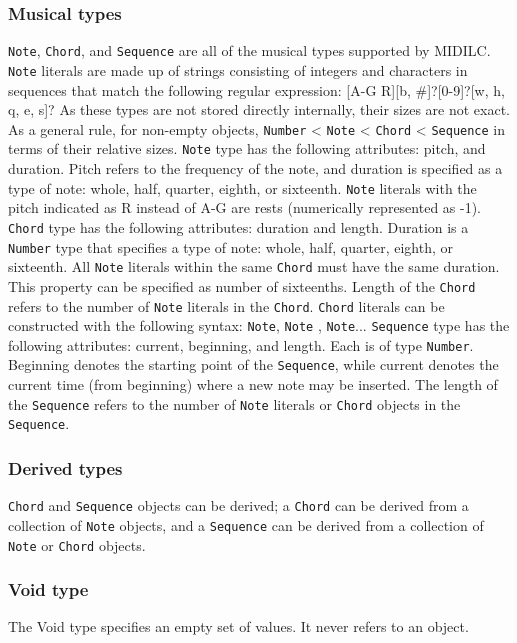 \documentclass[12pt,A4]{book}
\begin{document}
\subsubsection{Musical types}
\verb|Note|, \verb|Chord|, and \verb|Sequence| are all of the musical types supported by MIDILC. \verb|Note| literals are  made up of strings consisting of integers and characters in sequences that match the following regular expression:
[A-G R][b, #]?[0-9]?[w, h, q, e, s]?
As these types are not stored directly internally, their sizes are not exact. As a general rule, for non-empty objects,
\verb|Number| < \verb|Note| < \verb|Chord| < \verb|Sequence| in terms of their relative sizes.
\verb|Note| type has the following attributes: pitch, and duration. Pitch refers to the frequency of the note, and duration is specified as a type of note: whole, half, quarter, eighth, or sixteenth.  \verb|Note| literals with the pitch indicated as R instead of A-G are rests (numerically represented as -1).
\verb|Chord| type has the following attributes: duration and length. Duration is a \verb|Number| type that specifies a type of note: whole, half, quarter, eighth, or sixteenth. All \verb|Note| literals within the same \verb|Chord| must have the same duration.  This property can be specified as number of sixteenths. Length of the \verb|Chord| refers to the number of \verb|Note| literals in the \verb|Chord|.
\verb|Chord| literals can be constructed with the following syntax:
{ \verb|Note|,  \verb|Note| , \verb|Note|... }
\verb|Sequence| type has the following attributes: current, beginning, and length. Each is of type \verb|Number|. Beginning denotes the starting point of the \verb|Sequence|, while current denotes the current time (from beginning) where a new note may be inserted. The length of the \verb|Sequence| refers to the number of \verb|Note| literals or \verb|Chord| objects in the \verb|Sequence|.
\subsubsection{Derived types}
\verb|Chord| and \verb|Sequence| objects can be derived; a \verb|Chord| can be derived from a collection of \verb|Note| objects, and a \verb|Sequence| can be derived from a collection of \verb|Note| or \verb|Chord| objects.
\subsubsection{Void type}
The Void type specifies an empty set of values. It never refers to an object.
\end{document}
